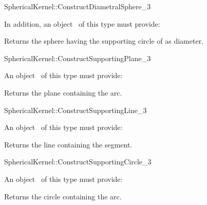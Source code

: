 \begin{ccRefFunctionObjectConcept}{SphericalKernel::ConstructDiametralSphere_3}

\ccRefines



In addition, an object \ccVar\ of this type must provide:

{Returns the sphere having the supporting circle of  as diameter.}

\end{ccRefFunctionObjectConcept}
\begin{ccRefFunctionObjectConcept}{SphericalKernel::ConstructSupportingPlane_3}


An object \ccVar\ of this type must provide:

{Returns the plane containing the arc.}

\end{ccRefFunctionObjectConcept}
\begin{ccRefFunctionObjectConcept}{SphericalKernel::ConstructSupportingLine_3}


An object \ccVar\ of this type must provide:

{Returns the line containing the segment.}

\end{ccRefFunctionObjectConcept}
\begin{ccRefFunctionObjectConcept}{SphericalKernel::ConstructSupportingCircle_3}


An object \ccVar\ of this type must provide:

{Returns the circle containing the arc.}

\end{ccRefFunctionObjectConcept}
